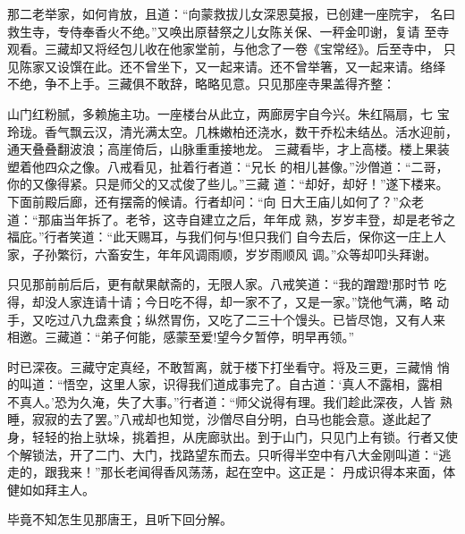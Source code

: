 那二老举家，如何肯放，且道：“向蒙救拔儿女深恩莫报，已创建一座院宇，
名曰救生寺，专侍奉香火不绝。”又唤出原替祭之儿女陈关保、一秤金叩谢，复请
至寺观看。三藏却又将经包儿收在他家堂前，与他念了一卷《宝常经》。后至寺中，
只见陈家又设馔在此。还不曾坐下，又一起来请。还不曾举箸，又一起来请。络绎
不绝，争不上手。三藏俱不敢辞，略略见意。只见那座寺果盖得齐整：

山门红粉腻，多赖施主功。一座楼台从此立，两廊房宇自今兴。朱红隔扇，七
宝玲珑。香气飘云汉，清光满太空。几株嫩柏还浇水，数干乔松未结丛。活水迎前，
通天叠叠翻波浪；高崖倚后，山脉重重接地龙。
三藏看毕，才上高楼。楼上果装塑着他四众之像。八戒看见，扯着行者道：“兄长
的相儿甚像。”沙僧道：“二哥，你的又像得紧。只是师父的又忒俊了些儿。”三藏
道：“却好，却好！”遂下楼来。下面前殿后廊，还有摆斋的候请。行者却问：“向
日大王庙儿如何了？”众老道：“那庙当年拆了。老爷，这寺自建立之后，年年成
熟，岁岁丰登，却是老爷之福庇。”行者笑道：“此天赐耳，与我们何与!但只我们
自今去后，保你这一庄上人家，子孙繁衍，六畜安生，年年风调雨顺，岁岁雨顺风
调。”众等却叩头拜谢。

只见那前前后后，更有献果献斋的，无限人家。八戒笑道：“我的蹭蹬!那时节
吃得，却没人家连请十请；今日吃不得，却一家不了，又是一家。”饶他气满，略
动手，又吃过八九盘素食；纵然胃伤，又吃了二三十个馒头。已皆尽饱，又有人来
相邀。三藏道：“弟子何能，感蒙至爱!望今夕暂停，明早再领。”

时已深夜。三藏守定真经，不敢暂离，就于楼下打坐看守。将及三更，三藏悄
悄的叫道：“悟空，这里人家，识得我们道成事完了。自古道：‘真人不露相，露相
不真人。’恐为久淹，失了大事。”行者道：“师父说得有理。我们趁此深夜，人皆
熟睡，寂寂的去了罢。”八戒却也知觉，沙僧尽自分明，白马也能会意。遂此起了
身，轻轻的抬上驮垛，挑着担，从庑廊驮出。到于山门，只见门上有锁。行者又使
个解锁法，开了二门、大门，找路望东而去。只听得半空中有八大金刚叫道：“逃
走的，跟我来！”那长老闻得香风荡荡，起在空中。这正是：
丹成识得本来面，体健如如拜主人。

毕竟不知怎生见那唐王，且听下回分解。